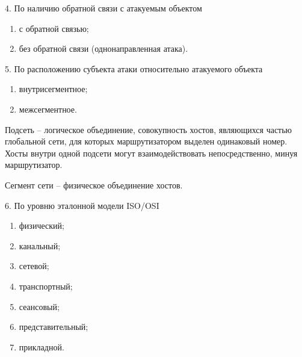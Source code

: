 \begin{frame}{4. По наличию обратной связи с атакуемым объектом}
	\begin{enumerate}
		\item с обратной связью;
		\item без обратной связи (однонаправленная атака).
	\end{enumerate}
\end{frame}


\begin{frame}{5. По расположению субъекта атаки относительно атакуемого объекта}
	\begin{enumerate}
		\item внутрисегментное;
		\item межсегментное.
	\end{enumerate}

	Подсеть --  логическое объединение, совокупность хостов,  являющихся частью глобальной сети,  для которых маршрутизатором выделен одинаковый номер. Хосты внутри одной подсети могут взаимодействовать непосредственно,  минуя маршрутизатор.

	Сегмент сети -- физическое объединение хостов.

\end{frame}


\begin{frame}{6. По уровню эталонной модели ISO/OSI}
	\begin{enumerate}
		\item физический;
		\item канальный;
		\item сетевой;
		\item транспортный; 
		\item сеансовый; 
		\item представительный; 
		\item прикладной. 
	\end{enumerate}
\end{frame}


